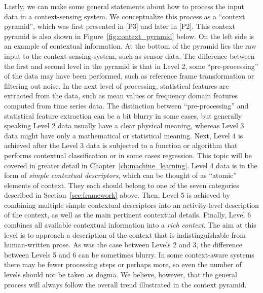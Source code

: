 Lastly, we can make some general statements about how to process the input data in a context-sensing system. We conceptualize this process as a ``context pyramid'', which was first presented in [P3] and later in [P2]. This context pyramid is also shown in Figure~\ref{fig:context_pyramid} below. On the left side is an example of contextual information. At the bottom of the pyramid lies the raw input to the context-sensing system, such as sensor data. The difference between the first and second level in the pyramid is that in Level 2, some ``pre-processing'' of the data may have been performed, such as reference frame transformation or filtering out noise. In the next level of processing, statistical features are extracted from the data, such as mean values or frequency domain features computed from time series data. The distinction between ``pre-processing'' and statistical feature extraction can be a bit blurry in some cases, but generally speaking Level 2 data usually have a clear physical meaning, whereas Level 3 data might have only a mathematical or statistical meaning. Next, Level 4 is achieved after the Level 3 data is subjected to a function or algorithm that performs contextual classification or in some cases regression. This topic will be covered in greater detail in Chapter~\ref{ch:machine_learning}. Level 4 data is in the form of \emph{simple contextual descriptors}, which can be thought of as ``atomic'' elements of context. They each should belong to one of the seven categories described in Section~\ref{sec:framework} above. Then, Level 5 is achieved by combining multiple simple contextual descriptors into an activity-level description of the context, as well as the main pertinent contextual details. Finally, Level 6 combines all available contextual information into a \emph{rich context}. The aim at this level is to approach a description of the context that is indistinguishable from human-written prose. As was the case between Levels 2 and 3, the difference between Levels 5 and 6 can be sometimes blurry. In some context-aware systems there may be fewer processing steps or perhaps more, so even the number of levels should not be taken as dogma. We believe, however, that the general process will always follow the overall trend illustrated in the context pyramid.


